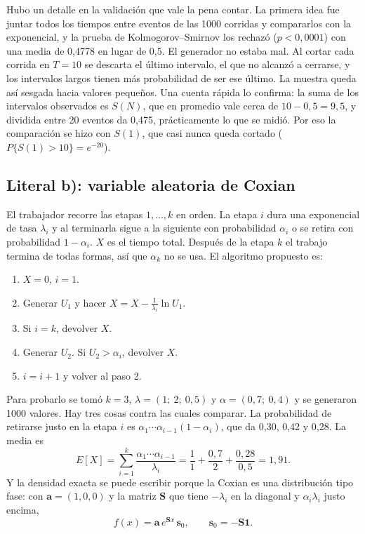 \documentclass[11pt,letterpaper]{article}
\begin{document}
Hubo un detalle en la validación que vale la pena contar. La primera idea fue juntar todos los tiempos
entre eventos de las 1000 corridas y compararlos con la exponencial, y la prueba de
Kolmogorov--Smirnov los rechazó ($p < 0{,}0001$) con una media de 0,4778 en lugar de 0,5. El generador
no estaba mal. Al cortar cada corrida en $T = 10$ se descarta el último intervalo, el que no alcanzó a
cerrarse, y los intervalos largos tienen más probabilidad de ser ese último. La muestra queda así
sesgada hacia valores pequeños. Una cuenta rápida lo confirma: la suma de los intervalos observados es
$S(N)$, que en promedio vale cerca de $10 - 0{,}5 = 9{,}5$, y dividida entre 20 eventos da 0,475,
prácticamente lo que se midió. Por eso la comparación se hizo con $S(1)$, que casi nunca queda cortado
($P\{S(1) > 10\} = e^{-20}$).

\subsection{Literal b): variable aleatoria de Coxian}

El trabajador recorre las etapas $1, \dots, k$ en orden. La etapa $i$ dura una exponencial de tasa
$\lambda_i$ y al terminarla sigue a la siguiente con probabilidad $\alpha_i$ o se retira con
probabilidad $1 - \alpha_i$. $X$ es el tiempo total. Después de la etapa $k$ el trabajo termina de
todas formas, así que $\alpha_k$ no se usa. El algoritmo propuesto es:

\begin{enumerate}[itemsep=1pt,label=\textsc{Paso} \arabic*:,leftmargin=5em]
\item $X = 0$, $i = 1$.
\item Generar $U_1$ y hacer $X = X - \frac{1}{\lambda_i}\ln U_1$.
\item Si $i = k$, devolver $X$.
\item Generar $U_2$. Si $U_2 > \alpha_i$, devolver $X$.
\item $i = i + 1$ y volver al paso 2.
\end{enumerate}

Para probarlo se tomó $k = 3$, $\lambda = (1;\ 2;\ 0{,}5)$ y $\alpha = (0{,}7;\ 0{,}4)$ y se generaron
1000 valores. Hay tres cosas contra las cuales comparar. La probabilidad de retirarse justo en la etapa
$i$ es $\alpha_1\cdots\alpha_{i-1}(1 - \alpha_i)$, que da 0,30, 0,42 y 0,28. La media es
\[
E[X] = \sum_{i=1}^{k}\frac{\alpha_1\cdots\alpha_{i-1}}{\lambda_i} = \frac{1}{1} + \frac{0{,}7}{2} + \frac{0{,}28}{0{,}5} = 1{,}91.
\]
Y la densidad exacta se puede escribir porque la Coxian es una distribución tipo fase: con
$\mathbf{a} = (1, 0, 0)$ y la matriz $\mathbf{S}$ que tiene $-\lambda_i$ en la diagonal y
$\alpha_i\lambda_i$ justo encima,
\[
f(x) = \mathbf{a}\,e^{\mathbf{S}x}\,\mathbf{s}_0, \qquad \mathbf{s}_0 = -\mathbf{S}\mathbf{1}.
\]
\end{document}
